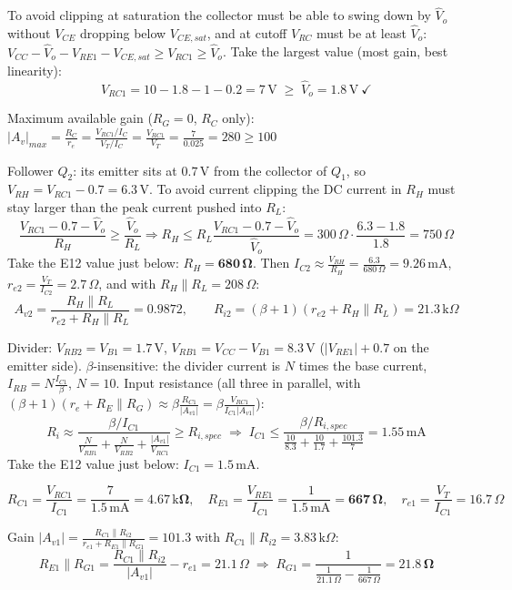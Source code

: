 \documentclass[11pt]{article}
\newcommand{\solstep}[2]{\par\medskip{\color{stepc}\textbf{Step #1 --- #2}}\par\nopagebreak}
\begin{document}
To avoid clipping at saturation the collector must be able to swing down by $\hat V_o$ without $V_{CE}$ dropping below $V_{CE,sat}$, and at cutoff $V_{RC}$ must be at least $\hat V_o$: $V_{CC} - \hat V_o - V_{RE1} - V_{CE,sat} \ge V_{RC1} \ge \hat V_o$. Take the largest value (most gain, best linearity): \[V_{RC1} = 10 - 1.8 - 1 - 0.2 = 7\,\mathrm{V} \;\ge\; \hat V_o = 1.8\,\mathrm{V}\ \checkmark\]

Maximum available gain ($R_G=0$, $R_C$ only): $|A_v|_{max} = \frac{R_C}{r_e} = \frac{V_{RC1}/I_C}{V_T/I_C} = \frac{V_{RC1}}{V_T} = \frac{7}{0.025} = 280 \ge 100$ \checkmark

Follower $Q_{2}$: its emitter sits at $0.7$\,V from the collector of $Q_{1}$, so $V_{RH} = V_{RC1} - 0.7 = 6.3\,\mathrm{V}$. To avoid current clipping the DC current in $R_H$ must stay larger than the peak current pushed into $R_L$: \[\frac{V_{RC1} - 0.7 - \hat V_o}{R_H} \ge \frac{\hat V_o}{R_L} \Rightarrow R_H \le R_L\frac{V_{RC1} - 0.7 - \hat V_o}{\hat V_o} = 300\,\Omega\cdot\frac{6.3 - 1.8}{1.8} = 750\,\Omega\]Take the E12 value just below: $R_H = \mathbf{680\,\Omega}$. Then $I_{C2} \approx \frac{V_{RH}}{R_H} = \frac{6.3}{680\,\Omega} = 9.26\,\mathrm{m}\mathrm{A}$, $r_{e2} = \frac{V_T}{I_{C2}} = 2.7\,\Omega$, and with $R_H \| R_L = 208\,\Omega$:\[A_{v2} = \frac{R_H\|R_L}{r_{e2} + R_H\|R_L} = 0.9872,\qquad R_{i2} = (\beta+1)(r_{e2} + R_H\|R_L) = 21.3\,\mathrm{k}\Omega\]
\solstep{3}{Bias current and resistors}Divider: $V_{RB2} = V_{B1} = 1.7\,\mathrm{V}$, $V_{RB1} = V_{CC} - V_{B1} = 8.3\,\mathrm{V}$ ($|V_{RE1}| + 0.7$ on the emitter side). $\beta$-insensitive: the divider current is $N$ times the base current, $I_{RB} = N\frac{I_{C1}}{\beta}$, $N = 10$. Input resistance (all three in parallel, with $(\beta+1)(r_e + R_E\|R_G) \approx \beta\frac{R_{C1}}{|A_{v1}|} = \beta\frac{V_{RC1}}{I_{C1}|A_{v1}|}$):\[R_i \approx \frac{\beta/I_{C1}}{\frac{N}{V_{RB1}} + \frac{N}{V_{RB2}} + \frac{|A_{v1}|}{V_{RC1}}} \ge R_{i,spec} \;\Rightarrow\; I_{C1} \le \frac{\beta/R_{i,spec}}{\frac{10}{8.3} + \frac{10}{1.7} + \frac{101.3}{7}} = 1.55\,\mathrm{m}\mathrm{A}\]Take the E12 value just below: $I_{C1} = 1.5\,\mathrm{m}\mathrm{A}$. 

\[R_{C1} = \frac{V_{RC1}}{I_{C1}} = \frac{7}{1.5\,\mathrm{m}\mathrm{A}} = \mathbf{4.67\,\mathrm{k}\Omega},\quad R_{E1} = \frac{V_{RE1}}{I_{C1}} = \frac{1}{1.5\,\mathrm{m}\mathrm{A}} = \mathbf{667\,\Omega},\quad r_{e1} = \frac{V_T}{I_{C1}} = 16.7\,\Omega\]

Gain $|A_{v1}| = \frac{R_{C1}\|R_{i2}}{r_{e1} + R_{E1}\|R_{G1}} = 101.3$ with $R_{C1}\|R_{i2} = 3.83\,\mathrm{k}\Omega$:\[R_{E1}\|R_{G1} = \frac{R_{C1}\|R_{i2}}{|A_{v1}|} - r_{e1} = 21.1\,\Omega \;\Rightarrow\; R_{G1} = \frac{1}{\frac{1}{21.1\,\Omega} - \frac{1}{667\,\Omega}} = \mathbf{21.8\,\Omega}\]
\end{document}
